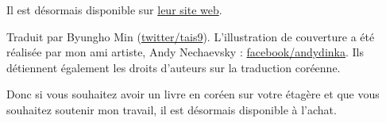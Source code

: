 Il est désormais disponible sur \href{http://go.yurichev.com/17343}{leur site web}.

Traduit par Byungho Min (\href{http://go.yurichev.com/17344}{twitter/tais9}).
L'illustration de couverture a été réalisée par mon ami artiste, Andy Nechaevsky :
\href{http://go.yurichev.com/17023}{facebook/andydinka}.
Ils détiennent également les droits d'auteurs sur la traduction coréenne.

Donc si vous souhaitez avoir un livre  en coréen sur votre étagère et que vous souhaitez soutenir mon travail, il est désormais disponible à l'achat.

